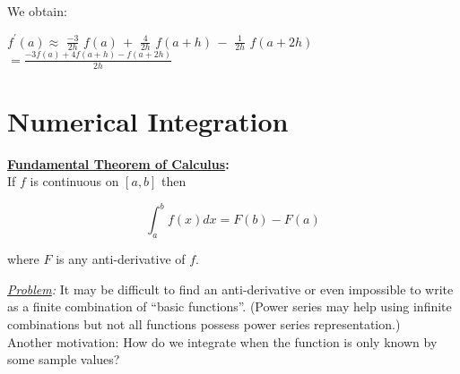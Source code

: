 \documentclass[a4paper,12pt]{report}
\begin{document}
	\noindent We obtain:
	
\begin{center}
	\vspace{-3mm}
	$f^\prime(a) \approx$ \large $\frac{-3}{2h}$ \normalsize $\!\!\! f(a) \, +$
	\large $\frac{4}{2h}$ \normalsize $\!\!\! f(a \! + \! h) \, -$
	\large $\frac{1}{2h}$ \normalsize $\!\!\! f(a \! + \! 2h)$\\
	\bigskip
	\Large $= \frac{ -3f(a) + 4f(a +  h) - f(a +2h)}{2h}$
\end{center}

\chapter{Numerical Integration}

\begin{center}
\fbox
{
	\parbox{0.6\textwidth}
	{
		\textbf{\underline{Fundamental Theorem of Calculus}:}\\
		If $f$ is continuous on $[a,b]$ then
		\begin{center}
		\vspace{-1cm}
			$$\int_{a}^{b}f(x) dx = F(b) - F(a)$$
		\end{center}
		where $F$ is any anti-derivative of $f$.
	}
}
\end{center}

	\noindent \textit{\underline{Problem}:} It may be difficult to find an anti-derivative or even impossible to write as a finite
	 combination of ``basic functions''.  (Power series may help using infinite combinations but not all functions possess
	 power series representation.)\\
	 
	 Another motivation: How do we integrate when the function is only known by some sample values?\\
	 
\end{document}
